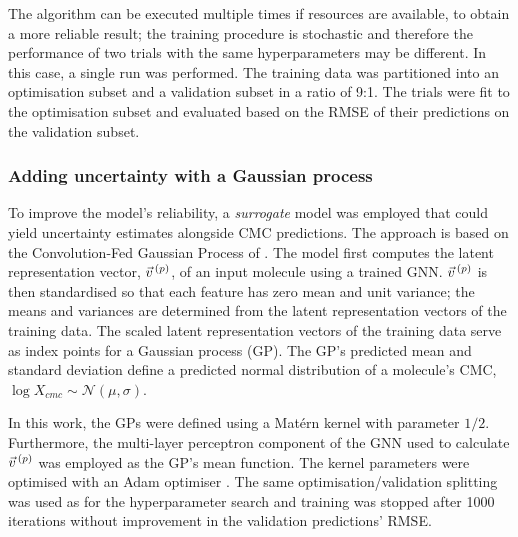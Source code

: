 The algorithm can be executed multiple times if resources are available, to
obtain a more reliable result; the training procedure is stochastic and
therefore the performance of two trials with the same hyperparameters may be
different. In this case, a single run was performed. The training data was
partitioned into an optimisation subset and a validation subset in a ratio of
9:1. The trials were fit to the optimisation subset and evaluated based on the
RMSE of their predictions on the validation subset.

\subsubsection{Adding uncertainty with a Gaussian process}

To improve the model's reliability, a \emph{surrogate} model was employed that
could yield uncertainty estimates alongside CMC predictions. The approach is
based on the Convolution-Fed Gaussian Process of
\citet{tranMethodsComparingUncertainty2020}. The model first computes the latent
representation vector, $\vec{v}^{\,(p)}{}$, of an input molecule using a trained GNN.
$\vec{v}^{\,(p)}{}$ is then standardised so that each feature has zero mean and unit
variance; the means and variances are determined from the latent representation
vectors of the training data. The scaled latent representation vectors of the
training data serve as index points for a Gaussian process (GP). The GP's
predicted mean and standard deviation define a predicted normal distribution of
a molecule's CMC, $\log X_{cmc} \sim \mathcal{N}(\mu, \sigma)$.

In this work, the GPs  were defined using a Mat\'ern kernel with parameter
$1/2$. Furthermore, the multi-layer perceptron component of the GNN used to
calculate $\vec{v}^{\,(p)}{}$ was employed as the GP's mean function. The kernel parameters
were optimised with an Adam optimiser \cite{kingmaAdamMethodStochastic2017a}.
The same optimisation/validation splitting was used as for the hyperparameter
search and training was stopped after \num{1000} iterations without improvement
in the validation predictions' RMSE.